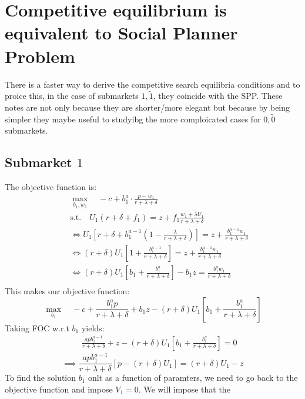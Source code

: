 \documentclass[12pt]{article} %
\theoremstyle{definition}
\begin{document}
\section{Competitive equilibrium is equivalent to Social Planner Problem}\label{intro} 

There is a faster way to derive the competitive search equilibria conditions and to proice this, in the case of submarkets $1, \tilde{1}$, they coincide with the SPP. These notes are not only because they are shorter/more elegant but because by being simpler they maybe useful to studyibg the more comploicated cases for $0, \tilde{0}$ submarkets. 

\subsection{Submarket $1$}
The objective function is: 
\begin{eqnarray*}
&& \max_{b_1,w_1} \quad -c + b_1^a \cdot \frac{p-w_1}{r+\lambda+\delta} \\
&& \text{s.t.} \quad U_1(r+\delta+f_1) = z + f_1 \frac{w_1+\lambda U_1}{r+\lambda+\delta} \\
&& \iff U_1 \left[r+\delta+b_1^{a-1}\left(1 - \frac{\lambda}{r+\lambda+\delta}\right)\right] = z + \frac{b_1^{a-1}w_1}{r+\lambda+\delta} \\
&& \iff (r+\delta) U_1 \left[1 + \frac{b_1^{a-1}}{r+\lambda+\delta}\right] = z + \frac{b_1^{a-1}w_1}{r+\lambda+\delta} \\
&& \iff (r+\delta) U_1 \left[b_1 + \frac{b_1^{a}}{r+\lambda+\delta}\right] - b_1 z = \frac{b_1^{a}w_1}{r+\lambda+\delta} \\
\end{eqnarray*}
This makes our objective function: 
\begin{equation}
\max_{b_1} \quad -c +\frac{b_1^a p}{r+\lambda+\delta} + b_1 z - (r+\delta) U_1 \left[b_1 + \frac{b_1^{a}}{r+\lambda+\delta}\right] \label{label01}\tag{\therefore}
\end{equation}
Taking FOC w.r.t $b_1$ yields: 
\begin{eqnarray*}
&& \frac{a p b_1^{a-1}}{r+\lambda+\delta} + z - (r+\delta) U_1 \left[b_1 + \frac{b_1^{a}}{r+\lambda+\delta}\right] = 0 
\end{eqnarray*}
\begin{equation}
    \implies \frac{a p b_1^{a-1}}{r+\lambda+\delta} \left[p-(r+\delta)U_1\right] = (r+\delta)U_1-z \label{label02}\tag{*}
\end{equation}
To find the solution $b_1$ onlt as a function of paramters, we need to go back to the objective function and impose $V_1=0$. We will impose that the 
\end{document}
